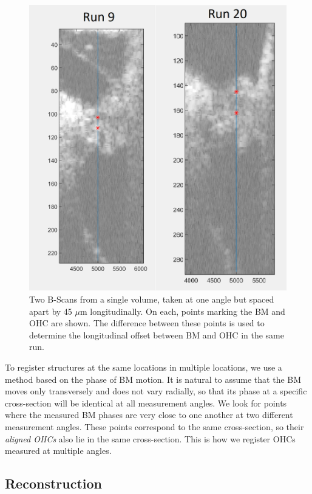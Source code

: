 \documentclass{article}
\begin{document}
\begin{figure}
	\centering
	\includegraphics[width = .5\textwidth]{"Figures/BScans Points.png"}
	\caption{Two B-Scans from a single volume, taken at one angle but spaced apart by 45 $\mu$m longitudinally. On each, points marking the BM and OHC are shown. The difference between these points is used to determine the longitudinal offset between BM and OHC in the same run.}
	\label{bscans}
\end{figure}

\par{To register structures at the same locations in multiple locations, we use a method based on the phase of BM motion. It is natural to assume that the BM moves only transversely and does not vary radially, so that its phase at a specific cross-section will be identical at all measurement angles. We look for points where the measured BM phases are very close to one another at two different measurement angles. These points correspond to the same cross-section, so their \textit{aligned OHCs} also lie in the same cross-section. This is how we register OHCs measured at multiple angles.}

\subsection{Reconstruction}
\end{document}
